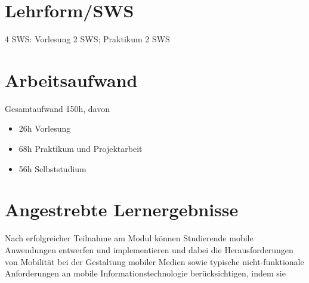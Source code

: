 \hypertarget{lehrformswspathlabelmi-2017modulbeschreibungen-bachelorba_mobile-computing}{%
\section*{Lehrform/SWS\label{/mi-2017/modulbeschreibungen-bachelor/BA_Mobile-Computing}}\label{lehrformswspathlabelmi-2017modulbeschreibungen-bachelorba_mobile-computing}}

4 SWS: Vorlesung 2 SWS; Praktikum 2 SWS

\hypertarget{arbeitsaufwandpathlabelmi-2017modulbeschreibungen-bachelorba_mobile-computing}{%
\section*{Arbeitsaufwand\label{/mi-2017/modulbeschreibungen-bachelor/BA_Mobile-Computing}}\label{arbeitsaufwandpathlabelmi-2017modulbeschreibungen-bachelorba_mobile-computing}}

Gesamtaufwand 150h, davon

\begin{itemize}
\tightlist
\item
  26h Vorlesung
\item
  68h Praktikum und Projektarbeit
\item
  56h Selbststudium
\end{itemize}

\hypertarget{angestrebte-lernergebnissepathlabelmi-2017modulbeschreibungen-bachelorba_mobile-computing}{%
\section*{Angestrebte
Lernergebnisse\label{/mi-2017/modulbeschreibungen-bachelor/BA_Mobile-Computing}}\label{angestrebte-lernergebnissepathlabelmi-2017modulbeschreibungen-bachelorba_mobile-computing}}

Nach erfolgreicher Teilnahme am Modul können Studierende mobile
Anwendungen entwerfen und implementieren und dabei die Herausforderungen
von Mobilität bei der Gestaltung mobiler Medien sowie typische
nicht-funktionale Anforderungen an mobile Informationstechnologie
berücksichtigen, indem sie

